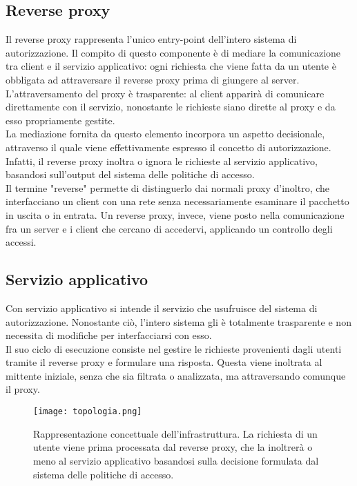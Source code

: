 \subsection{Reverse proxy}
Il reverse proxy rappresenta l'unico entry-point dell'intero sistema di autorizzazione. Il compito di questo componente è di
mediare la comunicazione tra client e il servizio applicativo: ogni richiesta che viene fatta da un utente è obbligata ad attraversare 
il reverse proxy prima di giungere al server. 
\\ L'attraversamento del proxy è trasparente: al client apparirà di comunicare direttamente con il servizio, nonostante le richieste siano dirette al proxy e da esso propriamente gestite. 
\\ La mediazione fornita da questo elemento incorpora un aspetto decisionale, attraverso il quale viene effettivamente espresso il concetto di autorizzazione. 
Infatti, il reverse proxy inoltra o ignora le richieste al servizio applicativo, basandosi sull'output del sistema delle politiche di accesso.  
\\ Il termine "reverse" permette di distinguerlo dai normali proxy d'inoltro, che interfacciano un client con una rete senza necessariamente esaminare il pacchetto in uscita 
o in entrata. Un reverse proxy, invece, viene posto nella comunicazione fra un server e i client che cercano di accedervi, applicando un controllo degli accessi. 
 

\subsection{Servizio applicativo} \label{serv_server}
Con servizio applicativo si intende il servizio che usufruisce del sistema di autorizzazione. 
Nonostante ciò, l'intero sistema gli è totalmente trasparente e non necessita di modifiche per interfacciarsi con esso.
\\Il suo ciclo di esecuzione consiste nel gestire 
le richieste provenienti dagli utenti tramite
 il reverse proxy e formulare una risposta.
Questa viene inoltrata al mittente iniziale, senza che sia filtrata o analizzata, ma attraversando comunque il proxy.

\begin{figure}[h]
    \texttt{[image: topologia.png]}
    \centering
    \caption[Rappresentazione concettuale del sistema di autorizzazione.]{Rappresentazione concettuale dell'infrastruttura. La richiesta di un utente viene prima processata dal reverse proxy, che
     la inoltrerà o meno al servizio applicativo basandosi sulla decisione formulata dal sistema delle politiche di accesso.}
    \label{topologia}
\end{figure}

